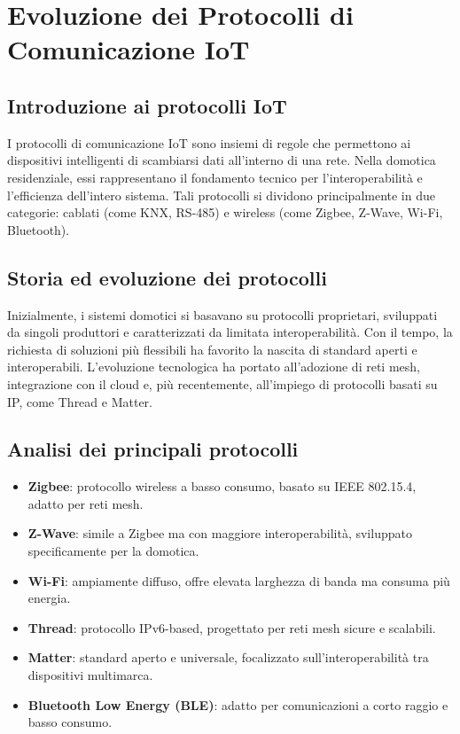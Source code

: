 \chapter{Evoluzione dei Protocolli di Comunicazione IoT}
\section{Introduzione ai protocolli IoT}
I protocolli di comunicazione IoT sono insiemi di regole che permettono ai dispositivi intelligenti di scambiarsi dati all'interno di una rete. Nella domotica residenziale, essi rappresentano il fondamento tecnico per l'interoperabilità e l'efficienza dell'intero sistema. Tali protocolli si dividono principalmente in due categorie: cablati (come KNX, RS-485) e wireless (come Zigbee, Z-Wave, Wi-Fi, Bluetooth).

\section{Storia ed evoluzione dei protocolli}
Inizialmente, i sistemi domotici si basavano su protocolli proprietari, sviluppati da singoli produttori e caratterizzati da limitata interoperabilità. Con il tempo, la richiesta di soluzioni più flessibili ha favorito la nascita di standard aperti e interoperabili. L'evoluzione tecnologica ha portato all'adozione di reti mesh, integrazione con il cloud e, più recentemente, all'impiego di protocolli basati su IP, come Thread e Matter.

\section{Analisi dei principali protocolli}
\begin{itemize}
    \item \textbf{Zigbee}: protocollo wireless a basso consumo, basato su IEEE 802.15.4, adatto per reti mesh.
    \item \textbf{Z-Wave}: simile a Zigbee ma con maggiore interoperabilità, sviluppato specificamente per la domotica.
    \item \textbf{Wi-Fi}: ampiamente diffuso, offre elevata larghezza di banda ma consuma più energia.
    \item \textbf{Thread}: protocollo IPv6-based, progettato per reti mesh sicure e scalabili.
    \item \textbf{Matter}: standard aperto e universale, focalizzato sull'interoperabilità tra dispositivi multimarca.
    \item \textbf{Bluetooth Low Energy (BLE)}: adatto per comunicazioni a corto raggio e basso consumo.
\end{itemize}


